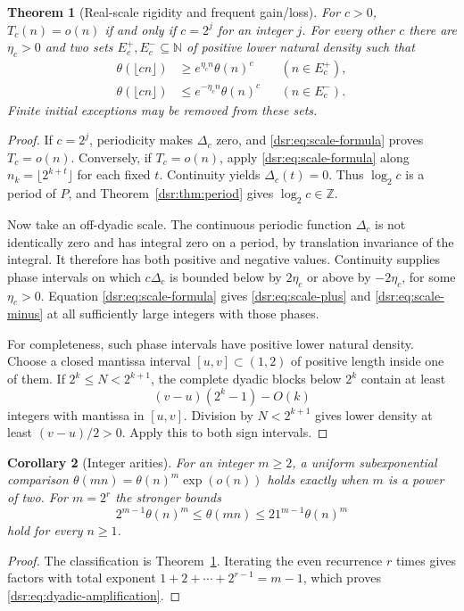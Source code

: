 \documentclass[11pt,a4paper]{article}
\numberwithin{equation}{section}
\newtheorem{theorem}{Theorem}[section]
\newtheorem{corollary}[theorem]{Corollary}
\theoremstyle{definition}
\theoremstyle{remark}
\newcommand{\N}{\mathbb N}
\newcommand{\Z}{\mathbb Z}
\theoremstyle{definition}
\theoremstyle{plain}
\begin{document}
\begin{theorem}[Real-scale rigidity and frequent gain/loss]
\label{dsr:thm:scales}
For $c>0$, $T_c(n)=o(n)$ if and only if $c=2^j$ for an integer $j$.
For every other $c$ there are $\eta_c>0$ and two sets $E_c^+,E_c^-\subseteq\N$
of positive lower natural density such that
\begin{align}
 \theta(\lfloor cn\rfloor)&\ge e^{\eta_cn}\theta(n)^c
                  &&(n\in E_c^+),\label{dsr:eq:scale-plus}\\
 \theta(\lfloor cn\rfloor)&\le e^{-\eta_cn}\theta(n)^c
                  &&(n\in E_c^-).\label{dsr:eq:scale-minus}
\end{align}
Finite initial exceptions may be removed from these sets.
\end{theorem}
\begin{proof}
If $c=2^j$, periodicity makes $\Delta_c$ zero, and
\eqref{dsr:eq:scale-formula} proves $T_c=o(n)$. Conversely, if $T_c=o(n)$, apply
\eqref{dsr:eq:scale-formula} along $n_k=\lfloor2^{k+t}\rfloor$ for each fixed
$t$. Continuity yields $\Delta_c(t)=0$. Thus $\log_2c$ is a period of $P$,
and Theorem~\ref{dsr:thm:period} gives $\log_2c\in\Z$.

Now take an off-dyadic scale. The continuous periodic function $\Delta_c$ is
not identically zero and has integral zero on a period, by translation
invariance of the integral. It therefore has both positive and negative
values. Continuity supplies phase intervals on which $c\Delta_c$ is bounded
below by $2\eta_c$ or above by $-2\eta_c$, for some $\eta_c>0$.
Equation \eqref{dsr:eq:scale-formula} gives \eqref{dsr:eq:scale-plus} and
\eqref{dsr:eq:scale-minus} at all sufficiently large integers with those phases.

For completeness, such phase intervals have positive lower natural density.
Choose a closed mantissa interval $[u,v]\subset(1,2)$ of positive length
inside one of them. If $2^k\le N<2^{k+1}$, the complete dyadic blocks below
$2^k$ contain at least
\[
 (v-u)(2^k-1)-O(k)
\]
integers with mantissa in $[u,v]$. Division by $N<2^{k+1}$ gives lower density
at least $(v-u)/2>0$. Apply this to both sign intervals.
\end{proof}

\begin{corollary}[Integer arities]
\label{dsr:cor:integer-arity}
For an integer $m\ge2$, a uniform subexponential comparison
$\theta(mn)=\theta(n)^m\exp(o(n))$ holds exactly when $m$ is a power of two.
For $m=2^r$ the stronger bounds
\begin{equation}
 2^{m-1}\theta(n)^m\le\theta(mn)\le21^{m-1}\theta(n)^m
\label{dsr:eq:dyadic-amplification}
\end{equation}
hold for every $n\ge1$.
\end{corollary}
\begin{proof}
The classification is Theorem~\ref{dsr:thm:scales}. Iterating the even recurrence
$r$ times gives factors with total exponent $1+2+\cdots+2^{r-1}=m-1$,
which proves \eqref{dsr:eq:dyadic-amplification}.
\end{proof}
\end{document}
